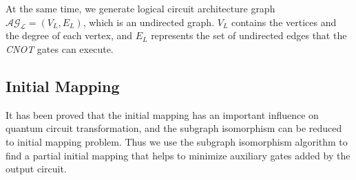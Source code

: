 \documentclass[runningheads]{llncs}
\begin{document}
At the same time, we generate logical circuit architecture graph $\mathcal{AG_{L}}=(V_{L},E_{L})$, which is an undirected graph. $V_{L}$ contains the vertices and the degree of each vertex, and $E_{L}$ represents the set of undirected edges that the \textit{CNOT} gates can execute.

\subsection{Initial Mapping}
It has been proved that the initial mapping has an important  influence on quantum circuit transformation,  and the subgraph isomorphism can be reduced to initial mapping problem. Thus we use the subgraph isomorphism algorithm to find a partial initial mapping that helps to minimize auxiliary gates added by the output circuit.
\end{document}
